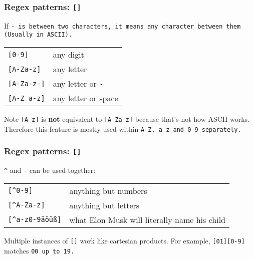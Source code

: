 \begin{frame}[fragile]
\frametitle{Regex patterns: \tt{[]}}
If \tt{-} is between two characters, it means any character between them
(Usually in ASCII). 
\begin{table}
    \centering
    \begin{tabular}{ll}
        \verb|[0-9]|        & any digit \\
        \verb|[A-Za-z]|     & any letter \\
        \verb|[A-Za-z-]|    & any letter or \tt{-} \\
        \verb|[A-Z a-z]|    & any letter or space \\
    \end{tabular}
\end{table}
\begin{block}{Note}
    \verb|[A-z]| is \textbf{not} equivalent to \verb|[A-Za-z]| because that's
    not how ASCII works. Therefore this feature is mostly used within \tt{A-Z},
    \tt{a-z} and \tt{0-9} separately.
\end{block}
\end{frame}

\begin{frame}[fragile]
\frametitle{Regex patterns: \tt{[]}}
\verb|^| and \verb|-| can be used together:
\begin{table}
    \centering
    \begin{tabular}{ll}
        \verb|[^0-9]|           & anything but numbers \\
        \verb|[^A-Za-z]|        & anything but letters \\
        \verb|[^a-z0-9äöüß]|    & what Elon Musk will literally name his child \\
    \end{tabular}
\end{table}
Multiple instances of \verb|[]| work like cartesian products.
For example, \verb|[01][0-9]| matches \tt{00} up to \tt{19}.
\end{frame}

